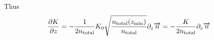 Thus
\begin{equation}
\frac{\partial K}{\partial z} = -\frac{1}{2n_\text{total}} K_0  \sqrt{\frac{n_\text{total}(z_\text{min})}{n_\text{total}}}\partial_{z}{\overrightarrow{n}}
                = -\frac{K}{2n_\text{total}} \partial_{z}{\overrightarrow{n}}
\label{Titan:eddy_diff_deriv}
\end{equation}
